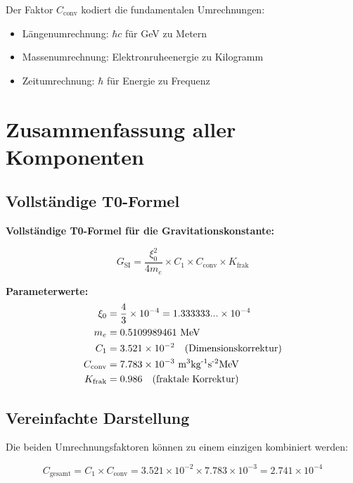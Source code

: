 \documentclass[12pt,a4paper]{article}
\begin{document}
	Der Faktor $C_{\text{conv}}$ kodiert die fundamentalen Umrechnungen:
	\begin{itemize}
		\item Längenumrechnung: $\hbar c$ für GeV zu Metern
		\item Massenumrechnung: Elektronruheenergie zu Kilogramm
		\item Zeitumrechnung: $\hbar$ für Energie zu Frequenz
	\end{itemize}
	
	\section{Zusammenfassung aller Komponenten}
	
	\subsection{Vollständige T0-Formel}
	
	\begin{keyresult}
		\textbf{Vollständige T0-Formel für die Gravitationskonstante:}
		
		\begin{equation}
			\boxed{G_{\text{SI}} = \frac{\xi_0^2}{4 m_e} \times C_1 \times C_{\text{conv}} \times K_{\text{frak}}}
			\label{eq:G_complete_detailed}
		\end{equation}
		
		\textbf{Parameterwerte:}
		\begin{align}
			\xi_0 &= \frac{4}{3} \times 10^{-4} = 1.333333... \times 10^{-4} \\
			m_e &= 0.5109989461 \text{ MeV} \\
			C_1 &= 3.521 \times 10^{-2} \quad \text{(Dimensionskorrektur)} \\
			C_{\text{conv}} &= 7.783 \times 10^{-3} \text{ m\textsuperscript{3}kg\textsuperscript{-1}s\textsuperscript{-2}MeV} \\
			K_{\text{frak}} &= 0.986 \quad \text{(fraktale Korrektur)}
		\end{align}
	\end{keyresult}
	
	\subsection{Vereinfachte Darstellung}
	
	Die beiden Umrechnungsfaktoren können zu einem einzigen kombiniert werden:
	
	\begin{equation}
		C_{\text{gesamt}} = C_1 \times C_{\text{conv}} = 3.521 \times 10^{-2} \times 7.783 \times 10^{-3} = 2.741 \times 10^{-4}
	\end{equation}
	
\end{document}
